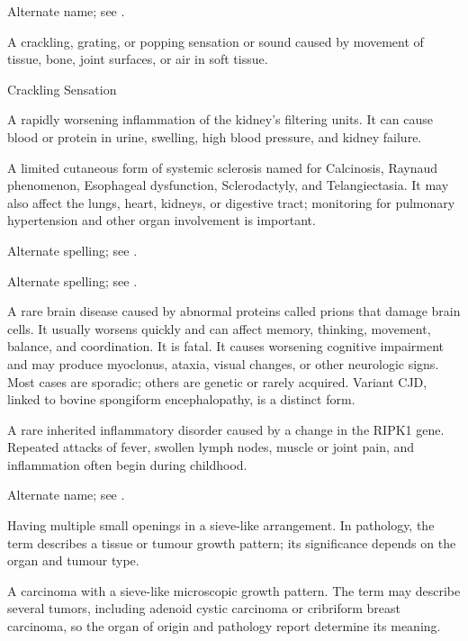  Alternate name; see .

 A crackling, grating, or popping sensation or sound caused by movement of tissue, bone, joint surfaces, or air in soft tissue.

\synonyms
Crackling Sensation

 A rapidly worsening inflammation of the kidney's filtering units. It can cause blood or protein in urine, swelling, high blood pressure, and kidney failure.

 A limited cutaneous form of systemic sclerosis named for Calcinosis, Raynaud phenomenon, Esophageal dysfunction, Sclerodactyly, and Telangiectasia. It may also affect the lungs, heart, kidneys, or digestive tract; monitoring for pulmonary hypertension and other organ involvement is important.

 Alternate spelling; see .

 Alternate spelling; see .

 A rare brain disease caused by abnormal proteins called prions that damage brain cells. It usually worsens quickly and can affect memory, thinking, movement, balance, and coordination. It is fatal.
It causes worsening cognitive impairment and may produce myoclonus, ataxia,
visual changes, or other neurologic signs. Most cases are sporadic; others
are genetic or rarely acquired. Variant CJD, linked to bovine spongiform
encephalopathy, is a distinct form.

 A rare inherited inflammatory disorder caused by a change in the RIPK1 gene. Repeated attacks of fever, swollen lymph nodes, muscle or joint pain, and inflammation often begin during childhood.

 Alternate name; see .

 Having multiple small openings in a sieve-like arrangement. In pathology, the term describes a tissue or tumour growth pattern; its significance depends on the organ and tumour type.

 A carcinoma with a sieve-like microscopic growth pattern. The term may describe several tumors, including adenoid cystic carcinoma or cribriform breast carcinoma, so the organ of origin and pathology report determine its meaning.

